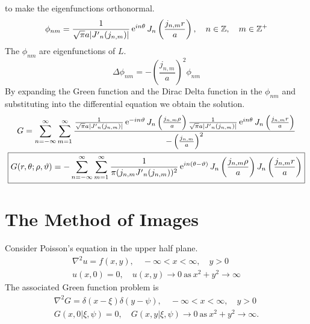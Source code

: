\begin{Example}
  to make the eigenfunctions orthonormal. 
  \[
  \phi_{n m} = \frac{1}{ \sqrt{\pi} a | {J'}_{n}(j_{n,m}) | }
  \mathop{\mathrm{e}}\nolimits^{i n \theta} J_{n} \left( \frac{j_{n,m} r}{a} \right), \quad
  n \in \mathbb{Z}, \quad m \in \mathbb{Z}^+
  \]
  The $\phi_{n m}$ are eigenfunctions of $L$.
  \[
  \Delta \phi_{n m} = - \left( \frac{j_{n,m}}{a} \right)^2 \phi_{n m}
  \]
  By expanding the Green function and the Dirac Delta function in 
  the $\phi_{n m}$ and substituting into the differential equation
  we obtain the solution.
  \begin{gather*}
    G = \sum_{n = -\infty}^\infty \sum_{m = 1}^\infty \frac{ \frac{1}{ \sqrt{\pi} a | {J'}_{n}(j_{n,m}) | }
      \mathop{\mathrm{e}}\nolimits^{-i n \vartheta} J_{n} \left( \frac{j_{n,m} \rho}{a} \right)
      \frac{1}{ \sqrt{\pi} a | {J'}_{n}(j_{n,m}) | }
      \mathop{\mathrm{e}}\nolimits^{i n \theta} J_{n} \left( \frac{j_{n,m} r}{a} \right) }
    { - \left( \frac{j_{n,m}}{a} \right)^2 } \\
    \boxed{
      G(r,\theta; \rho,\vartheta) = - \sum_{n = -\infty}^\infty \sum_{m = 1}^\infty 
      \frac{1}{ \pi (j_{n,m} {J'}_{n}(j_{n,m}))^2 }
      \mathop{\mathrm{e}}\nolimits^{i n (\theta - \vartheta)} 
      J_{n} \left( \frac{j_{n,m} \rho}{a} \right)
      J_{n} \left( \frac{j_{n,m} r}{a} \right)
      }
  \end{gather*}
\end{Example}









\section{The Method of Images}





Consider Poisson's equation in the upper half plane.
\begin{gather*}
  \nabla^2 u = f(x,y), \quad -\infty < x < \infty,\quad y > 0 
  \\
  u(x,0) = 0, \quad u(x,y) \to 0\ \mathrm{as}\ x^2 + y^2 \to \infty
\end{gather*}
The associated Green function problem is
\begin{gather*}
  \nabla^2 G = \delta(x-\xi)\delta(y-\psi), \quad -\infty < x < \infty,\quad y > 0 
  \\
  G(x,0|\xi,\psi) = 0, \quad G(x,y|\xi,\psi) \to 0\ \mathrm{as}\ x^2 + y^2 \to \infty.
\end{gather*}

